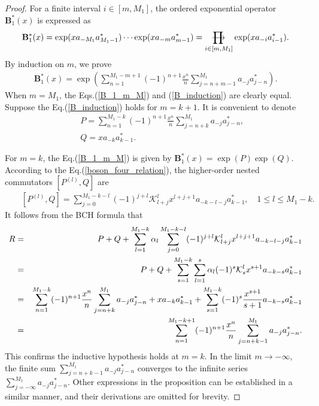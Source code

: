 \documentclass[11pt,reqno]{amsart}
\numberwithin{equation}{section}
\def\rprod{\mathop{\prod{\mkern-28.0mu}{\mathbf\longrightarrow}}}
\begin{document}
\begin{proof}
For a finite interval $i\in[m,M_{1}]$, the ordered exponential operator $\mathbf{B}^{\ast}_{1}(x)$ is expressed as
\begin{eqnarray}\label{B_1_m_M}
\mathbf{B}^{\ast}_{1}(x)=\exp(xa_{-M_{1}}a^{\ast}_{M_{1}-1})
\cdots\exp(xa_{-m}a^{\ast}_{m-1})=\rprod\limits
_{i\in[m,M_{1}]}\exp(xa_{-i}a^{\ast}_{i-1}).
\end{eqnarray}
By induction on $m$, we prove
\begin{eqnarray}\label{B_induction}
\mathbf{B}^{\ast}_{1}(x)=\exp\left(\sum\limits^{M_{1}-m+1}_{n=1}(-1)^{n+1}
\frac{x^{n}}{n}\sum\limits^{M_{1}}_{j=n+m-1}a_{-j}a^{\ast}_{j-n}\right).
\end{eqnarray}
When $m=M_{1}$, the Eqs.(\ref{B_1_m_M}) and (\ref{B_induction})  are clearly equal. Suppose the Eq.(\ref{B_induction}) holds for $m=k+1$. It is convenient to denote
\begin{eqnarray}
&&P=\sum\limits^{M_{1}-k}_{n=1}(-1)^{n+1}
\frac{x^{n}}{n}\sum\limits^{M_{1}}_{j=n+k}a_{-j}a^{\ast}_{j-n},\\
&&Q=xa_{-k}a^{\ast}_{k-1}.
\end{eqnarray}


For $m=k$, the Eq.(\ref{B_1_m_M}) is given by $\mathbf{B}^{\ast}_{1}(x)=\exp(P)\exp(Q)$. According to the Eq.(\ref{boson_four_relation}), the higher-order nested commutators $[P^{(l)},Q]$ are
\begin{eqnarray}
&&[P^{(l)},Q]=\sum\limits^{M_{1}-k-l}_{j=0}(-1)^{j+l}\mathcal{K}^{l}_{l+j}x^{l+j+1}
a_{-k-l-j}a^{\ast}_{k-1},\quad 1\leq l\leq M_{1}-k.
\end{eqnarray}
It follows from the BCH formula that
\begin{eqnarray}
R&=&P+Q+\sum\limits^{M_{1}-k}_{l=1}\alpha_{l}\sum\limits^{M_{1}-k-l}_{j=0}(-1)^{j+l}
\mathcal{K}^{l}_{l+j}x^{l+j+1}a_{-k-l-j}a^{\ast}_{k-1}\notag\\
&=&P+Q+\sum\limits^{M_{1}-k}_{s=1}\sum\limits^{s}_{l=1}\alpha_{l}(-1)^{s}
\mathcal{K}^{l}_{s}x^{s+1}a_{-k-s}a^{\ast}_{k-1}\notag\\
&=&\sum\limits^{M_{1}-k}_{n=1}(-1)^{n+1}
\frac{x^{n}}{n}\sum\limits^{M_{1}}_{j=n+k}a_{-j}a^{\ast}_{j-n}+xa_{-k}a^{\ast}_{k-1}
+\sum\limits^{M_{1}-k}_{s=1}(-1)^{s}\frac{x^{s+1}}{s+1}a_{-k-s}a^{\ast}_{k-1}\notag\\
&=&\sum\limits^{M_{1}-k+1}_{n=1}(-1)^{n+1}\frac{x^{n}}{n}\sum\limits^{M_{1}}_{j=n+k-1}
a_{-j}a^{\ast}_{j-n}.
\end{eqnarray}
This confirms the inductive hypothesis holds at $m=k$. In the limit $m\rightarrow-\infty$, the finite sum $\sum\limits^{M_{1}}_{j=n+k-1}
a_{-j}a^{\ast}_{j-n}$ converges to the infinite series $\sum\limits^{M_{1}}_{j=-\infty}
a_{-j}a^{\ast}_{j-n}$. Other expressions in the proposition can be established in a similar manner, and their derivations are omitted for brevity.
\end{proof}
\end{document}

